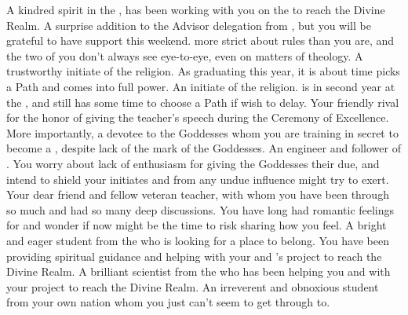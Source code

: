 \documentclass[char]{GL2020}
\begin{document}
\begin{contacts}
    \contact{\cCurse{}} A kindred spirit in the \pFarm{}, \cCurse{} has been working with you on the \iBeansMB{} to reach the Divine Realm.
    \contact{\cEbbPriest{}} A surprise addition to the Advisor delegation from \pShip{}, but you will be grateful to have \cEbbPriest{\their} support this weekend. \cEbbPriest{\Theyare} more strict about rules than you are, and the two of you don't always see eye-to-eye, even on matters of theology.
    \contact{\cInitiate{}} A trustworthy initiate of the \pShippies{} religion. As \cInitiate{\theyare} graduating this year, it is about time \cInitiate{} picks a Path and comes into \cInitiate{\their} full power.
    \contact{\cWarlordDaughter{}} An initiate of the \pShippies{} religion. \cWarlordDaughter{} is in \cWarlordDaughter{\their} second year at the \pSc{}, and still has some time to choose a Path if \cWarlordDaughter{\they} wish\cWarlordDaughter{\verbes} to delay.
    \contact{\cPirate{}} Your friendly rival for the honor of giving the teacher's speech during the Ceremony of Excellence. More importantly, a devotee to the \pShip{} Goddesses whom you are training in secret to become a \cPirate{\cleric}, despite \cPirate{\their} lack of the mark of the Goddesses.
    \contact{\cBunker{}} An engineer and follower of \cEbb{}. You worry about \cBunker{\their} lack of enthusiasm for giving the Goddesses their due, and intend to shield your initiates \cInitiate{} and \cWarlordDaughter{} from any undue influence \cBunker{\they} might try to exert.
    \contact{\cMusic{}} Your dear friend and fellow veteran teacher, with whom you have been through so much and had so many deep discussions. You have long had romantic feelings for \cMusic{\them} and wonder if now might be the time to risk sharing how you feel.
    \contact{\cAmbition{}} A bright and eager student from the \pTech{} who is looking for a place to belong. You have been providing spiritual guidance and \cAmbition{\theyare} helping with your and \cCurse{}’s project to reach the Divine Realm. 
    \contact{\cAssistantScientist{}} A brilliant scientist from the \pTech{} who has been helping you and \cCurse{} with your project to reach the Divine Realm.
    \contact{\cPirateChild{}} An irreverent and obnoxious student from your own nation whom you just can’t seem to get through to.
\end{contacts}
\end{document}
